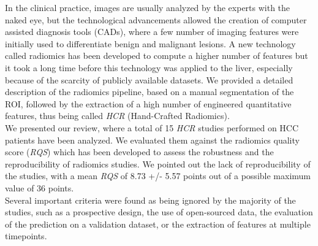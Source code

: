 In the clinical practice, images are usually analyzed by the experts
with the naked eye, but the technological advancements allowed the
creation of computer assisted diagnosis tools (CADs), where a few number
of imaging features were initially used to differentiate benign and
malignant lesions.
A new technology called radiomics has been developed to compute a higher
number of features but it took a long time before this technology was
applied to the liver, especially because of the scarcity of publicly
available datasets.
We provided a detailed description of the radiomics pipeline, 
based on a manual segmentation of the ROI, followed by the extraction of
a high number of engineered quantitative features, thus being called
\emph{HCR} (Hand-Crafted Radiomics).\\
We presented our review, where a total of 15 \emph{HCR} studies
performed on HCC patients have been analyzed.
We evaluated them against the radiomics quality score (\emph{RQS})
which has been developed to assess the robustness and the
reproducibility of radiomics studies.
We pointed out the lack of reproducibility of the studies, with a mean
\emph{RQS} of 8.73 +/- 5.57 points out of a possible maximum value of 36
points.\\
Several important criteria were found as being ignored by the majority
of the studies, such as a prospective design, the use of open-sourced
data, the evaluation of the prediction on a validation dataset, or the
extraction of features at multiple timepoints.

